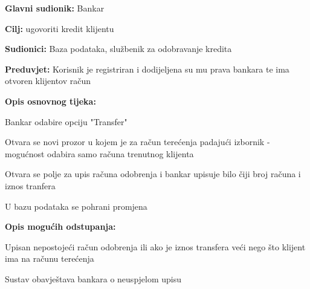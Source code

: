             	
            	 \noindent {}
            	\begin{packed_item}
            		
            		\item \textbf{Glavni sudionik: }Bankar
            		\item  \textbf{Cilj:} ugovoriti kredit klijentu
            		\item  \textbf{Sudionici:} Baza podataka, službenik za odobravanje kredita
            		\item  \textbf{Preduvjet:} Korisnik je registriran i dodijeljena su mu prava bankara te ima otvoren klijentov račun
            		\item  \textbf{Opis osnovnog tijeka:}
            		
            		\item[] \begin{packed_enum}
            			
            			\item Bankar odabire opciju "Transfer"
            			\item Otvara se novi prozor u kojem je za račun terećenja padajući izbornik - mogućnost odabira samo računa trenutnog klijenta
            			\item Otvara se polje za upis računa odobrenja i bankar upisuje bilo čiji broj računa i iznos tranfera
            			\item U bazu podataka se pohrani promjena 
            		\end{packed_enum}
            		
            		\item  \textbf{Opis mogućih odstupanja:} 
            		
            		\item[] \begin{packed_item}
            			
            			\item[3.a] Upisan nepostojeći račun  odobrenja ili ako je iznos transfera veći nego što klijent ima na računu terećenja
            			\item[] \begin{packed_enum}
            				
            				\item Sustav obavještava bankara o neuspjelom upisu 
            				
            			\end{packed_enum}
            			
            		\end{packed_item}
            	\end{packed_item}
            
